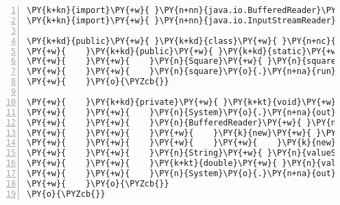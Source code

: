 \begin{Verbatim}[commandchars=\\\{\},numbers=left,firstnumber=1,stepnumber=1,frame=single,fontsize=\small]
\PY{k+kn}{import}\PY{+w}{ }\PY{n+nn}{java.io.BufferedReader}\PY{o}{;}
\PY{k+kn}{import}\PY{+w}{ }\PY{n+nn}{java.io.InputStreamReader}\PY{o}{;}

\PY{k+kd}{public}\PY{+w}{ }\PY{k+kd}{class}\PY{+w}{ }\PY{n+nc}{Square}\PY{+w}{ }\PY{o}{\PYZob{}}
\PY{+w}{    }\PY{k+kd}{public}\PY{+w}{ }\PY{k+kd}{static}\PY{+w}{ }\PY{k+kt}{void}\PY{+w}{ }\PY{n+nf}{main}\PY{o}{(}\PY{n}{String}\PY{o}{[}\PY{o}{]}\PY{+w}{ }\PY{n}{args}\PY{o}{)}\PY{+w}{ }\PY{k+kd}{throws}\PY{+w}{ }\PY{n}{Exception}\PY{+w}{ }\PY{o}{\PYZob{}}
\PY{+w}{    }\PY{+w}{    }\PY{n}{Square}\PY{+w}{ }\PY{n}{square}\PY{+w}{ }\PY{o}{=}\PY{+w}{ }\PY{k}{new}\PY{+w}{ }\PY{n}{Square}\PY{o}{(}\PY{o}{)}\PY{o}{;}
\PY{+w}{    }\PY{+w}{    }\PY{n}{square}\PY{o}{.}\PY{n+na}{run}\PY{o}{(}\PY{o}{)}\PY{o}{;}
\PY{+w}{    }\PY{o}{\PYZcb{}}

\PY{+w}{    }\PY{k+kd}{private}\PY{+w}{ }\PY{k+kt}{void}\PY{+w}{ }\PY{n+nf}{run}\PY{o}{(}\PY{o}{)}\PY{+w}{ }\PY{k+kd}{throws}\PY{+w}{ }\PY{n}{Exception}\PY{+w}{ }\PY{o}{\PYZob{}}
\PY{+w}{    }\PY{+w}{    }\PY{n}{System}\PY{o}{.}\PY{n+na}{out}\PY{o}{.}\PY{n+na}{print}\PY{o}{(}\PY{l+s}{"自乗を計算する値を入力してください："}\PY{o}{)}\PY{o}{;}
\PY{+w}{    }\PY{+w}{    }\PY{n}{BufferedReader}\PY{+w}{ }\PY{n}{reader}\PY{+w}{ }\PY{o}{=}
\PY{+w}{    }\PY{+w}{    }\PY{+w}{    }\PY{k}{new}\PY{+w}{ }\PY{n+nf}{BufferedReader}\PY{o}{(}
\PY{+w}{    }\PY{+w}{    }\PY{+w}{    }\PY{+w}{    }\PY{k}{new}\PY{+w}{ }\PY{n+nf}{InputStreamReader}\PY{o}{(}\PY{n}{System}\PY{o}{.}\PY{n+na}{in}\PY{o}{)}\PY{o}{)}\PY{o}{;}
\PY{+w}{    }\PY{+w}{    }\PY{n}{String}\PY{+w}{ }\PY{n}{valueString}\PY{+w}{ }\PY{o}{=}\PY{+w}{ }\PY{n}{reader}\PY{o}{.}\PY{n+na}{readLine}\PY{o}{(}\PY{o}{)}\PY{o}{;}
\PY{+w}{    }\PY{+w}{    }\PY{k+kt}{double}\PY{+w}{ }\PY{n}{value}\PY{+w}{ }\PY{o}{=}\PY{+w}{ }\PY{n}{Double}\PY{o}{.}\PY{n+na}{parseDouble}\PY{o}{(}\PY{n}{valueString}\PY{o}{)}\PY{o}{;}
\PY{+w}{    }\PY{+w}{    }\PY{n}{System}\PY{o}{.}\PY{n+na}{out}\PY{o}{.}\PY{n+na}{println}\PY{o}{(}\PY{l+s}{"計算結果："}\PY{+w}{ }\PY{o}{+}\PY{+w}{ }\PY{o}{(}\PY{n}{value}\PY{+w}{ }\PY{o}{*}\PY{+w}{ }\PY{n}{value}\PY{o}{)}\PY{o}{)}\PY{o}{;}
\PY{+w}{    }\PY{o}{\PYZcb{}}
\PY{o}{\PYZcb{}}
\end{Verbatim}
